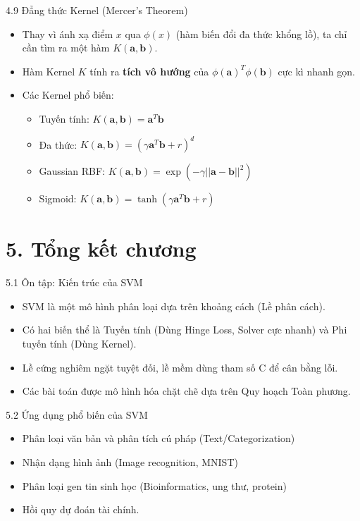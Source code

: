 \documentclass[aspectratio=169, 12pt]{beamer}
\begin{document}
\begin{frame}{4.9 Đẳng thức Kernel (Mercer's Theorem)}
    \begin{itemize}
        \item Thay vì ánh xạ điểm $x$ qua $\phi(x)$ (hàm biến đổi đa thức khổng lồ), ta chỉ cần tìm ra một hàm $K(\mathbf{a}, \mathbf{b})$.
        \item Hàm Kernel $K$ tính ra \textbf{tích vô hướng} của $\phi(\mathbf{a})^T \phi(\mathbf{b})$ cực kì nhanh gọn.
        \item Các Kernel phổ biến:
        \begin{itemize}
            \item Tuyến tính: $K(\mathbf{a}, \mathbf{b}) = \mathbf{a}^T \mathbf{b}$
            \item Đa thức: $K(\mathbf{a}, \mathbf{b}) = (\gamma \mathbf{a}^T \mathbf{b} + r)^d$
            \item Gaussian RBF: $K(\mathbf{a}, \mathbf{b}) = \exp(-\gamma ||\mathbf{a} - \mathbf{b}||^2)$
            \item Sigmoid: $K(\mathbf{a}, \mathbf{b}) = \tanh(\gamma \mathbf{a}^T \mathbf{b} + r)$
        \end{itemize}
    \end{itemize}
\end{frame}


\section{5. Tổng kết chương}

\begin{frame}{5.1 Ôn tập: Kiến trúc của SVM}
    \begin{itemize}
        \item SVM là một mô hình phân loại dựa trên khoảng cách (Lề phân cách).
        \item Có hai biến thể là Tuyến tính (Dùng Hinge Loss, Solver cực nhanh) và Phi tuyến tính (Dùng Kernel).
        \item Lề cứng nghiêm ngặt tuyệt đối, lề mềm dùng tham số C để cân bằng lỗi.
        \item Các bài toán được mô hình hóa chặt chẽ dựa trên Quy hoạch Toàn phương.
    \end{itemize}
\end{frame}

\begin{frame}{5.2 Ứng dụng phổ biến của SVM}
    \begin{itemize}
        \item Phân loại văn bản và phân tích cú pháp (Text/Categorization)
        \item Nhận dạng hình ảnh (Image recognition, MNIST)
        \item Phân loại gen tin sinh học (Bioinformatics, ung thư, protein)
        \item Hồi quy dự đoán tài chính.
    \end{itemize}
\end{frame}
\end{document}
